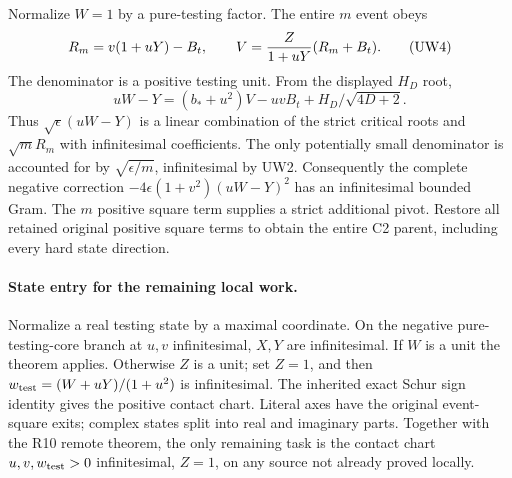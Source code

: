 Normalize $W=1$ by a pure-testing factor. The entire $m$ event obeys
\[
 R_m=v(1+uY)-B_t,\qquad
 V={Z\over1+uY}(R_m+B_t).                         \tag{UW4}
\]
The denominator is a positive testing unit. From the displayed
$H_D$ root,
\[
 uW-Y=(b_*+u^2)V-uvB_t+H_D/\sqrt{4D+2}.
\]
Thus $\sqrt\epsilon(uW-Y)$ is a linear combination of the strict
critical roots and $\sqrt mR_m$ with infinitesimal coefficients.
The only potentially small denominator is accounted for by
$\sqrt{\epsilon/m}$, infinitesimal by UW2. Consequently the complete
negative correction $-4\epsilon(1+v^2)(uW-Y)^2$ has an
infinitesimal bounded Gram. The $m$ positive square term supplies a strict additional
pivot. Restore all retained original positive square terms to obtain the entire
C2 parent, including every hard state direction.

\paragraph{State entry for the remaining local work.}
Normalize a real testing state by a maximal coordinate. On the
negative pure-testing-core branch at $u,v$ infinitesimal, $X,Y$
are infinitesimal. If $W$ is a unit the theorem applies. Otherwise
$Z$ is a unit; set $Z=1$, and then
$w_{\rm test}=(W+uY)/(1+u^2)$ is infinitesimal. The inherited exact
Schur sign identity gives the positive contact chart. Literal axes
have the original event-square exits; complex states split into real
and imaginary parts. Together with the R10 remote theorem, the only
remaining task is the contact chart $u,v,w_{\rm test}>0$
infinitesimal, $Z=1$, on any source not already proved locally.

\label{component:p78dfeedee062}
\label{p78dfeedee062:sec:r17-r4-eunit}
\label{component:p1c9902e9a6f2}
\label{p1c9902e9a6f2:sec:r18-r3-eunit}

\label{component:p9a223c96c696}
\label{p9a223c96c696:sec:r17-r7-bounded-a}
\label{component:p482fcad1a2e2}
\label{p482fcad1a2e2:sec:r17-r8-small-r}
\label{component:p0d4eedd6c7a4}
\label{p0d4eedd6c7a4:sec:r9-weak-A-remote}
\label{component:p99372d145f17}
\label{p99372d145f17:sec:r11-small-r-local}
\label{component:p34609a6519a6}
\label{p34609a6519a6:sec:r11-small-r-remote}
